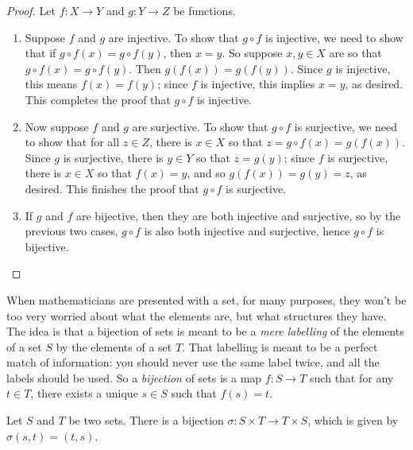 \documentclass[11pt,dvipsnames]{book}
\numberwithin{equation}{section} %
\numberwithin{figure}{section} %
\numberwithin{table}{section} %
\begin{document}
\begin{proof}
Let $f:X\rightarrow Y$ and $g:Y\rightarrow Z$ be functions. 
\begin{enumerate}
\item Suppose $f$ and $g$ are injective. To show that $g\circ f$ is injective, we need to show that if $g\circ f(x)=g\circ f(y)$, then $x=y$. So suppose $x,y\in X$ are so that $g\circ f(x)=g\circ f(y)$. Then $g(f(x))=g(f(y))$. Since $g$ is injective, this means $f(x)=f(y)$; since $f$ is injective, this implies $x=y$, as desired. This completes the proof that $g\circ f$ is injective.
\item Now suppose $f$ and $g$ are surjective. To show that $g\circ f$ is surjective, we need to show that for all $z\in Z$, there is $x\in X$ so that $z=g\circ f(x)=g(f(x))$. Since $g$ is surjective, there is $y\in Y$ so that $z=g(y)$; since $f$ is surjective, there is $x\in X$ so that $f(x)=y$, and so $g(f(x))=g(y)=z$, as desired. This finishes the proof that $g\circ f$ is surjective. 
\item If $g$ and $f$ are bijective, then they are both injective and surjective, so by the previous two cases, $g\circ f$ is also both injective and surjective, hence $g\circ f$ is bijective. 
\end{enumerate}
\end{proof}

When mathematicians are presented with a set, for many purposes, they won't be too very worried about what the elements are, but what structures they have.
The idea is that a bijection of sets is meant to be a \emph{mere labelling} of the elements of a set $S$ by the elements of a set $T$.
That labelling is meant to be a perfect match of information:
you should never use the same label twice, and
all the labels should be used.
So a \emph{bijection} of sets is a map $f\colon S \to T$ such that for any $t\in T$, there exists a unique $s\in S$ such that $f(s)=t$.

\begin{example}
	Let $S$ and $T$ be two sets.
	There is a bijection $ \sigma \colon S \times T \to T \times S $, which is given by $\sigma(s,t) = (t,s)$.
\end{example}
\end{document}
